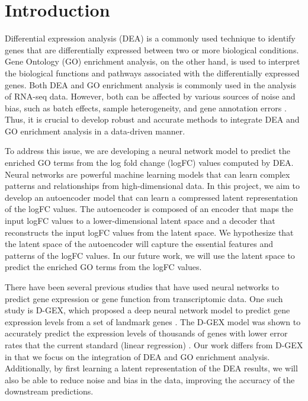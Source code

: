 
\section{Introduction}

Differential expression analysis (DEA) is a commonly used technique to identify genes that
are differentially expressed between two or more biological conditions. Gene Ontology
(GO) enrichment analysis, on the other hand, is used to interpret the biological
functions and pathways associated with the differentially expressed genes. Both DEA and
GO enrichment analysis is commonly used in the analysis of RNA-seq data. However, both
can be affected by various sources of noise and bias, such as batch effects, sample
heterogeneity, and gene annotation errors \cite{koch2018beginner}. Thus, it is crucial to
develop robust and accurate methods to integrate DEA and GO enrichment analysis in a
data-driven manner.

\vspace{0.2cm}

To address this issue, we are developing a neural network model to predict the enriched
GO terms from the log fold change (logFC) values computed by DEA. Neural networks are
powerful machine learning models that can learn complex patterns and relationships from
high-dimensional data. In this project, we aim to develop an autoencoder model that can
learn a compressed latent representation of the logFC values. The autoencoder is composed
of an encoder that maps the input logFC values to a lower-dimensional latent space and a
decoder that reconstructs the input logFC values from the latent space. We hypothesize
that the latent space of the autoencoder will capture the essential features and patterns
of the logFC values. In our future work, we will use the latent space to predict the
enriched GO terms from the logFC values.

\vspace{0.2cm}

There have been several previous studies that have used neural networks to predict
gene expression or gene function from transcriptomic data. One such study is D-GEX,
which proposed a deep neural network model to predict gene expression levels from a set
of landmark genes \cite{D-GEX}. The D-GEX model was shown to accurately predict the
expression levels of thousands of genes with lower error rates that the current standard
(linear regression) \cite{D-GEX}. Our work differs from D-GEX in that we
focus on the integration of DEA and GO enrichment analysis. Additionally, by first
learning a latent representation of the DEA results, we will also be able to reduce
noise and bias in the data, improving the accuracy of the downstream predictions.
